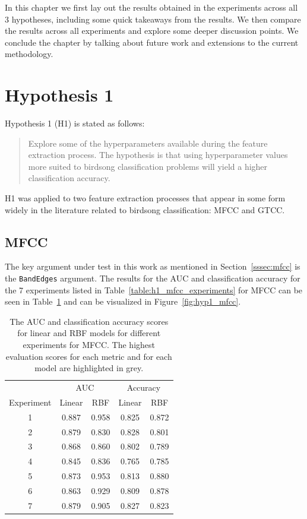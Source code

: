 In this chapter we first lay out the results obtained in the experiments across
all 3 hypotheses, including some quick takeaways from the results. We then
compare the results across all experiments and explore some deeper discussion
points. We conclude the chapter by talking about future work and extensions to
the current methodology.

\section{Hypothesis 1}

Hypothesis 1 (H1) is stated as follows:

\begin{quote}
Explore some of the hyperparameters available during the feature extraction
process. The hypothesis is that using hyperparameter values more suited to
birdsong classification problems will yield a higher classification accuracy.
\end{quote}

H1 was applied to two feature extraction processes that appear in some form
widely in the literature related to birdsong classification: MFCC and GTCC\@.

\subsection{MFCC}

The key argument under test in this work as mentioned in
Section~\ref{sssec:mfcc} is the \texttt{BandEdges} argument. The results for the
AUC and classification accuracy for the 7 experiments listed in
Table~\ref{table:h1_mfcc_experiments} for MFCC can be seen in
Table~\ref{table:hyp1_mfcc} and can be visualized in Figure~\ref{fig:hyp1_mfcc}.

\begin{table}[ht]
\begin{center}
\begin{tabular}{cc c|c c}
\toprule
& \multicolumn{2}{c|}{AUC} & \multicolumn{2}{c}{Accuracy} \\
  Experiment & Linear & RBF & Linear & RBF \\ [0.5ex]
\midrule
  1 & \cellcolor{lightgray} 0.887 & \cellcolor{lightgray} 0.958 & 0.825 & 0.872 \\
  2 & 0.879 & 0.830 & \cellcolor{lightgray} 0.828 & 0.801 \\
  3 & 0.868 & 0.860 & 0.802 & 0.789 \\
  4 & 0.845 & 0.836 & 0.765 & 0.785 \\
  5 & 0.873 & 0.953 & 0.813 & \cellcolor{lightgray} 0.880 \\
  6 & 0.863 & 0.929 & 0.809 & 0.878 \\
  7 & 0.879 & 0.905 & 0.827 & 0.823 \\
\bottomrule
\end{tabular}
\caption{The AUC and classification accuracy scores for linear and RBF models
for different experiments for MFCC\@. The highest evaluation scores for each metric
and for each model are highlighted in grey.}\label{table:hyp1_mfcc}
\end{center}
\end{table}


